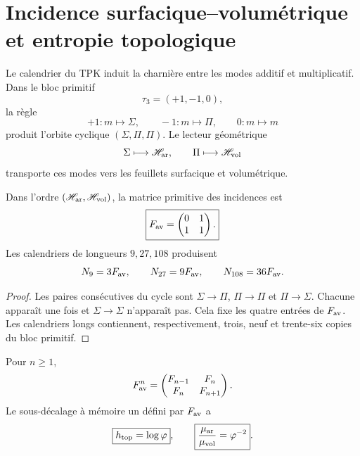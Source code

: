 \section{Incidence surfacique--volumétrique et entropie topologique}

Le calendrier du TPK induit la charnière entre les modes additif et
multiplicatif. Dans le bloc primitif
\[
 \tau_3=(+1,-1,0),
\]
la règle
\[
 +1:m\mapsto\Sigma,
 \qquad
 -1:m\mapsto\Pi,
 \qquad
 0:m\mapsto m
\]
produit l’orbite cyclique \((\Sigma,\Pi,\Pi)\). Le lecteur géométrique
\[
 \Sigma\longmapsto\mathscr H_{\rm ar},
 \qquad
 \Pi\longmapsto\mathscr H_{\rm vol}
\]
transporte ces modes vers les feuillets surfacique et volumétrique.

\begin{theorem}
\label{v:thm:incidencia-hojas-anexo}
Dans l’ordre \((\mathscr H_{\rm ar},\mathscr H_{\rm vol})\), la matrice
primitive des incidences est
\begin{equation}
 \boxed{
 F_{\rm av}=
 \begin{pmatrix}0&1\\1&1\end{pmatrix}.}
 \label{v:eq:fav-anexo-informacion}
\end{equation}
Les calendriers de longueurs \(9,27,108\) produisent
\[
 N_9=3F_{\rm av},
 \qquad N_{27}=9F_{\rm av},
 \qquad N_{108}=36F_{\rm av}.
\]
\end{theorem}

\begin{proof}
Les paires consécutives du cycle sont
\(\Sigma\to\Pi\), \(\Pi\to\Pi\) et \(\Pi\to\Sigma\). Chacune apparaît une
fois et \(\Sigma\to\Sigma\) n’apparaît pas. Cela fixe les quatre entrées de
\(F_{\rm av}\). Les calendriers longs contiennent, respectivement, trois,
neuf et trente-six copies du bloc primitif.
\end{proof}

\begin{theorem}
\label{v:thm:fibonacci-parry-anexo}
Pour \(n\geq1\),
\begin{equation}
 F_{\rm av}^{n}
 =\begin{pmatrix}F_{n-1}&F_n\\F_n&F_{n+1}\end{pmatrix}.
 \label{v:eq:potencias-fav-anexo}
\end{equation}
Le sous-décalage à mémoire un défini par \(F_{\rm av}\) a
\begin{equation}
 \boxed{h_{\rm top}=\log\varphi},
 \qquad
 \boxed{\frac{\mu_{\rm ar}}{\mu_{\rm vol}}=\varphi^{-2}}.
 \label{v:eq:entropia-parry-hojas-anexo}
\end{equation}
\end{theorem}

